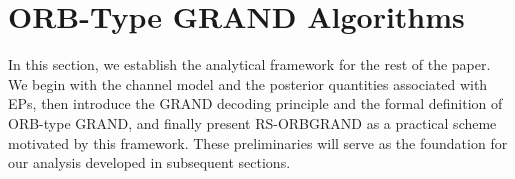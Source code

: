 \documentclass[letterpaper,draftclsnofoot,onecolumn]{IEEEtran}
\begin{document}
\section{ORB-Type GRAND Algorithms}\label{Sec:preliminaries}

In this section, we establish the analytical framework for the rest of the paper. We begin with the channel model and the posterior quantities associated with EPs, then introduce the GRAND decoding principle and the formal definition of ORB-type GRAND, and finally present RS-ORBGRAND as a practical scheme motivated by this framework. These preliminaries will serve as the foundation for our analysis developed in subsequent sections.

\end{document}
